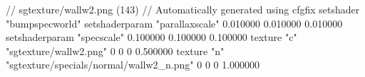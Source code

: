 // sgtexture/wallw2.png (143)
// Automatically generated using cfgfix
setshader "bumpspecworld"
setshaderparam "parallaxscale" 0.010000 0.010000 0.010000
setshaderparam "specscale" 0.100000 0.100000 0.100000
texture "c" "sgtexture/wallw2.png" 0 0 0 0.500000
texture "n" "sgtexture/specials/normal/wallw2_n.png" 0 0 0 1.000000
